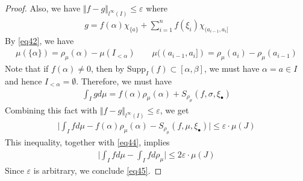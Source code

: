 \documentclass[12pt,b5paper,notitlepage]{article}
\theoremstyle{definition}
\newtheorem{rem}[df]{Remark}
\theoremstyle{plain}
\newcommand{\blt}{\bullet}
\newcommand{\Rbb}{\mathbb R}
\newcommand{\Supp}{\mathrm{Supp}}
\newcommand{\eps}{\varepsilon}
\numberwithin{equation}{section}
\begin{document}
\begin{proof}
Also, we have $\Vert f-g\Vert_{l^\infty(I)}\leq\eps$ where
\begin{align*}
g=f(\alpha)\chi_{\{a\}}+\sum_{i=1}^n f(\xi_i)\chi_{(a_{i-1},a_i]}
\end{align*}
By \eqref{eq42}, we have
\begin{align*}
\mu(\{\alpha\})=\rho_\mu(\alpha)-\mu(I_{<\alpha})\qquad \mu((a_{i-1},a_i])=\rho_\mu(a_i)-\rho_\mu(a_{i-1})
\end{align*}
Note that if $f(\alpha)\neq 0$, then by $\Supp_I(f)\subset[\alpha,\beta]$, we must have $\alpha=a\in I$ and hence $I_{<\alpha}=\emptyset$. Therefore, we must have
\begin{align*}
\int_I gd\mu=f(\alpha)\rho_\mu(\alpha)+ S_{\rho_\mu}(f,\sigma,\xi_\blt)
\end{align*}
Combining this fact with $\Vert f-g\Vert_{l^\infty(I)}\leq\eps$, we get
\begin{align*}
\Big| \int_I fd\mu-f(\alpha)\rho_\mu(\alpha)-S_{\rho_\mu}(f,\mu,\xi_\blt)\Big|\leq \eps\cdot\mu(J)
\end{align*}
This inequality, together with \eqref{eq44}, implies
\begin{align*}
\Big| \int_I fd\mu-\int_I fd\rho_\mu\Big|\leq 2\eps\cdot\mu(J)
\end{align*}
Since $\eps$ is arbitrary, we conclude \eqref{eq45}.
\end{proof}







\begin{comment}
\begin{rem}
There is a bijection between:
\begin{itemize}
\item An increasing right-continuous function $\rho:(a,b]\rightarrow\Rbb_{\geq0}$.
\item An increasing right-continuous function $\varrho:[a,b]\rightarrow\Rbb_{\geq0}$.
\end{itemize}
They are related by
\begin{align}
\rho=\varrho|_{(a,b]}
\end{align}
Equivalently, viewing $\rho$ as a function on $[a,b]$ (cf. Conv. \ref{lb10}),
\begin{align}
\rho=\varrho-\varrho(a)\cdot\chi_{\{a\}}\qquad 
\end{align}
Since $\rho=\varrho-\varrho(a)+\varrho(a)\chi_{(a,b]}$ and $\int_a^b fd\chi_{(a,b]}=f(a)$, by Rem. \ref{lb6}, we have
\begin{align}
\int_a^b fd\rho=f(a)\varrho(a)+\int_a^bfd\varrho
\end{align}
These relations allow us to convert the setting of \cite[Sec. 25.7]{Gui-A}, which uses $\varrho$ to present the Riesz representation theorem, to the current setting.
\end{rem}
\end{comment}
\end{document}
